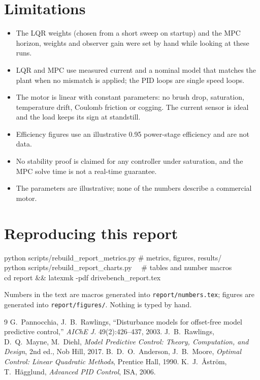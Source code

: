 \documentclass[10pt,a4paper]{article}
\begin{document}
\section{Limitations}
\begin{itemize}[leftmargin=1.2em,itemsep=2pt]
\item The LQR weights (chosen from a short sweep on startup) and the MPC horizon, weights and observer gain were set by hand while looking at these runs.
\item LQR and MPC use measured current and a nominal model that matches the plant when no mismatch is applied; the PID loops are single speed loops.
\item The motor is linear with constant parameters: no brush drop, saturation, temperature drift, Coulomb friction or cogging. The current sensor is ideal and the load keeps its sign at standstill.
\item Efficiency figures use an illustrative 0.95 power-stage efficiency and are not data.
\item No stability proof is claimed for any controller under saturation, and the MPC solve time is not a real-time guarantee.
\item The parameters are illustrative; none of the numbers describe a commercial motor.
\end{itemize}

\section{Reproducing this report}
\begin{tcolorbox}[colback=mist,colframe=mist,boxrule=0pt,arc=0pt,left=8pt,top=4pt,bottom=4pt]
\small\ttfamily
python scripts/rebuild\_report\_metrics.py \# metrics, figures, results/\\
python scripts/rebuild\_report\_charts.py \ \ \# tables and number macros\\
cd report \&\& latexmk -pdf drivebench\_report.tex
\end{tcolorbox}
Numbers in the text are macros generated into \texttt{report/numbers.tex}; figures are generated into \texttt{report/figures/}. Nothing is typed by hand.

\begin{thebibliography}{9}\small
{} G.~Pannocchia, J.~B.~Rawlings, ``Disturbance models for offset-free model predictive control,'' \emph{AIChE J.} 49(2):426--437, 2003.
 J.~B.~Rawlings, D.~Q.~Mayne, M.~Diehl, \emph{Model Predictive Control: Theory, Computation, and Design}, 2nd ed., Nob Hill, 2017.
 B.~D.~O.~Anderson, J.~B.~Moore, \emph{Optimal Control: Linear Quadratic Methods}, Prentice Hall, 1990.
 K.~J.~{\AA}str{\"o}m, T.~H{\"a}gglund, \emph{Advanced PID Control}, ISA, 2006.
\end{thebibliography}
\end{document}
